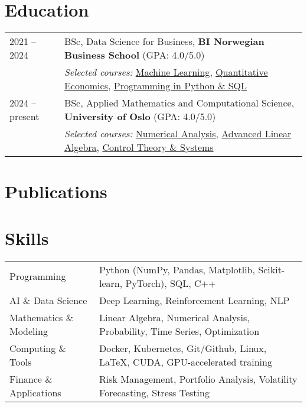 \documentclass[a4paper,10pt]{article}
\begin{document}
\section{Education}
\begin{tabularx}{\linewidth}{@{}l X@{}}

2021 -- 2024 & 
BSc, Data Science for Business, \textbf{BI Norwegian Business School} 
\hfill (GPA: 4.0/5.0) \\
& \textit{Selected courses:} 
\href{https://programmeinfo.bi.no/en/course/EBA-3530/2023-spring}{Machine Learning}, 
\href{https://programmeinfo.bi.no/nb/course/EBA-3650/2024-spring}{Quantitative Economics}, 
\href{https://programmeinfo.bi.no/nb/course/EBA-3420/2022-spring}{Programming in Python \& SQL} \\[1ex]

2024 -- present & 
BSc, Applied Mathematics and Computational Science, \textbf{University of Oslo} 
\hfill (GPA: 4.0/5.0) \\
& \textit{Selected courses:} 
\href{https://www.uio.no/studier/emner/matnat/math/MAT3110/h25/index.html}{Numerical Analysis}, 
\href{https://www.uio.no/studier/emner/matnat/math/MAT1125/h25/index.html}{Advanced Linear Algebra}, 
\href{https://www.uio.no/studier/emner/matnat/its/TEK4090/h25/index.html}{Control Theory \& Systems} \\

\end{tabularx}



\section{Publications}
\begin{refsection}
\nocite{*}
\printbibliography[heading=none]
\end{refsection}

\section{Skills}
\begin{tabularx}{\linewidth}{@{}l X@{}}
Programming & Python (NumPy, Pandas, Matplotlib, Scikit-learn, PyTorch), SQL, C++ \\
AI \& Data Science & Deep Learning, Reinforcement Learning, NLP \\
Mathematics \& Modeling & Linear Algebra, Numerical Analysis, Probability, Time Series, Optimization \\
Computing \& Tools & Docker, Kubernetes, Git/Github, Linux, LaTeX, CUDA, GPU-accelerated training \\
Finance \& Applications & Risk Management, Portfolio Analysis, Volatility Forecasting, Stress Testing \\
\end{tabularx}

\vfill
{}
\end{document}
